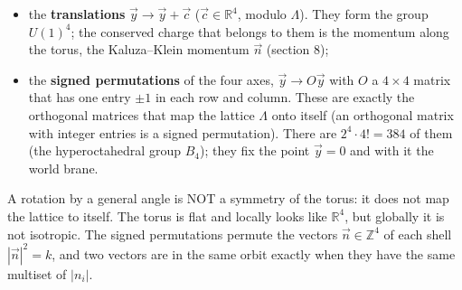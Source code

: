 \documentclass[10pt,a4paper]{article}
\begin{document}
\begin{itemize}
\item the \textbf{translations} $\vec y\to\vec y+\vec c$ ($\vec c\in\mathbb R^4$, modulo $\Lambda$). They form the group $U(1)^4$; the conserved charge that belongs to them is the momentum along the torus, the Kaluza–Klein momentum $\vec n$ (section 8);
\item the \textbf{signed permutations} of the four axes, $\vec y\to O\vec y$ with $O$ a $4\times4$ matrix that has one entry $\pm1$ in each row and column. These are exactly the orthogonal matrices that map the lattice $\Lambda$ onto itself (an orthogonal matrix with integer entries is a signed permutation). There are $2^4\cdot4!=384$ of them (the hyperoctahedral group $B_4$); they fix the point $\vec y=0$ and with it the world brane.
\end{itemize}
A rotation by a general angle is NOT a symmetry of the torus: it does not map the lattice to itself. The torus is flat and locally looks like $\mathbb R^4$, but globally it is not isotropic. The signed permutations permute the vectors $\vec n\in\mathbb Z^4$ of each shell $|\vec n|^2=k$, and two vectors are in the same orbit exactly when they have the same multiset of $|n_i|$.
\end{document}
